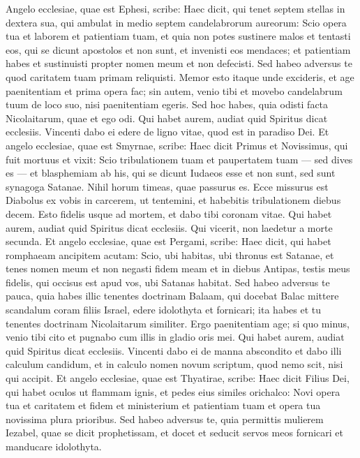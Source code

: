 \begin{biblechapter}
\begin{biblechapter}
\verse Angelo ecclesiae, quae est Ephesi, scribe:
 Haec dicit, qui tenet septem stellas in dextera sua, qui ambulat in medio septem candelabrorum aureorum: 
\verse Scio opera tua et laborem et patientiam tuam, et quia non potes sustinere malos et tentasti eos, qui se dicunt apostolos et non sunt, et invenisti eos mendaces; 
\verse et patientiam habes et sustinuisti propter nomen meum et non defecisti. 
\verse Sed habeo adversus te quod caritatem tuam primam reliquisti. 
\verse Memor esto itaque unde excideris, et age paenitentiam et prima opera fac; sin autem, venio tibi et movebo candelabrum tuum de loco suo, nisi paenitentiam egeris. 
\verse Sed hoc habes, quia odisti facta Nicolaitarum, quae et ego odi.
 \verse Qui habet aurem, audiat quid Spiritus dicat ecclesiis. Vincenti dabo ei edere de ligno vitae, quod est in paradiso Dei.
 \verse Et angelo ecclesiae, quae est Smyrnae, scribe:
 Haec dicit Primus et Novissimus, qui fuit mortuus et vixit: 
\verse Scio tribulationem tuam et paupertatem tuam — sed dives es — et blasphemiam ab his, qui se dicunt Iudaeos esse et non sunt, sed sunt synagoga Satanae. 
\verse Nihil horum timeas, quae passurus es. Ecce missurus est Diabolus ex vobis in carcerem, ut tentemini, et habebitis tribulationem diebus decem. Esto fidelis usque ad mortem, et dabo tibi coronam vitae.
 \verse Qui habet aurem, audiat quid Spiritus dicat ecclesiis. Qui vicerit, non laedetur a morte secunda.
 \verse Et angelo ecclesiae, quae est Pergami, scribe:
 Haec dicit, qui habet romphaeam ancipitem acutam: 
\verse Scio, ubi habitas, ubi thronus est Satanae, et tenes nomen meum et non negasti fidem meam et in diebus Antipas, testis meus fidelis, qui occisus est apud vos, ubi Satanas habitat. 
 \verse Sed habeo adversus te pauca, quia habes illic tenentes doctrinam Balaam, qui docebat Balac mittere scandalum coram filiis Israel, edere idolothyta et fornicari; 
\verse ita habes et tu tenentes doctrinam Nicolaitarum similiter. 
 \verse Ergo paenitentiam age; si quo minus, venio tibi cito et pugnabo cum illis in gladio oris mei.
 \verse Qui habet aurem, audiat quid Spiritus dicat ecclesiis. Vincenti dabo ei de manna abscondito et dabo illi calculum candidum, et in calculo nomen novum scriptum, quod nemo scit, nisi qui accipit.
 \verse Et angelo ecclesiae, quae est Thyatirae, scribe: Haec dicit Filius Dei, qui habet oculos ut flammam ignis, et pedes eius similes orichalco: 
\verse Novi opera tua et caritatem et fidem et ministerium et patientiam tuam et opera tua novissima plura prioribus. 
\verse Sed habeo adversus te, quia permittis mulierem Iezabel, quae se dicit prophetissam, et docet et seducit servos meos fornicari et manducare idolothyta. 

\end{biblechapter}
\end{biblechapter}

